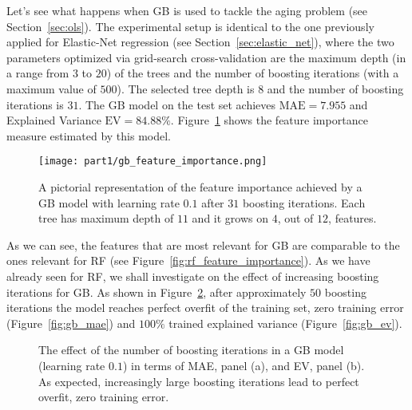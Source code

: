	    Let's see what happens when GB is used to tackle the aging problem (see Section~\ref{sec:ols}).
	    The experimental setup is identical to the one previously applied for Elastic-Net regression (see Section~\ref{sec:elastic_net}), where the two parameters optimized via grid-search cross-validation are the maximum depth (in a range from $3$ to $20$) of the trees and the number of boosting iterations (with a maximum value of $500$).
	    The selected tree depth is $8$ and the number of boosting iterations is $31$.
		The GB model on the test set achieves $\text{MAE} = 7.955$ and Explained Variance $\text{EV} = 84.88\%$.
	    Figure~\ref{fig:gb_feature_importance} shows the feature importance measure estimated by this model.
	    \begin{figure}[!h]
	    \centering
	    \texttt{[image: part1/gb\_feature\_importance.png]}
    	\caption{A pictorial representation of the feature importance achieved by a GB model with learning rate $0.1$ after $31$ boosting iterations. Each tree has maximum depth of $11$ and it grows on $4$, out of $12$, features.} \label{fig:gb_feature_importance}
	    \end{figure}
   		As we can see, the features that are most relevant for GB are comparable to the ones relevant for RF (see Figure~\ref{fig:rf_feature_importance}).
	    As we have already seen for RF, we shall investigate on the effect of increasing boosting iterations for GB. As shown in Figure~\ref{fig:gb_increasing}, after approximately $50$ boosting iterations the model reaches perfect overfit of the training set, \ie zero training error (Figure~\ref{fig:gb_mae}) and $100\%$ trained explained variance (Figure~\ref{fig:gb_ev}).
        \begin{figure}[!h]
    	\centering
    	\caption{The effect of the number of boosting iterations in a GB model (learning rate $0.1$) in terms of MAE, panel (a), and EV, panel (b). As expected, increasingly large boosting iterations lead to perfect overfit, \ie zero training error.}\label{fig:gb_increasing}
	    \end{figure}
	    



